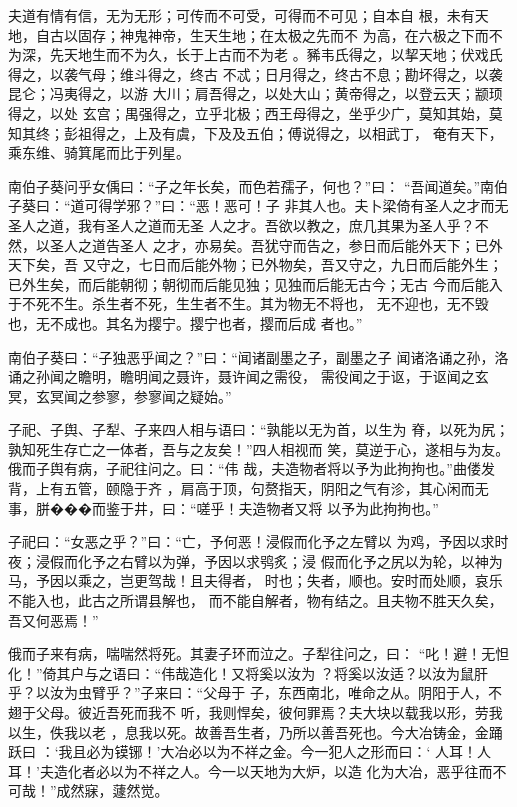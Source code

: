 \documentclass[a4paper,12pt,UTF8,twoside]{ctexbook}
\begin{document}
夫道有情有信，无为无形；可传而不可受，可得而不可见；自本自 根，未有天地，自古以固存；神鬼神帝，生天生地；在太极之先而不 为高，在六极之下而不为深，先天地生而不为久，长于上古而不为老 。豨韦氏得之，以挈天地；伏戏氏得之，以袭气母；维斗得之，终古 不忒；日月得之，终古不息；勘坏得之，以袭昆仑；冯夷得之，以游 大川；肩吾得之，以处大山；黄帝得之，以登云天；颛顼得之，以处 玄宫；禺强得之，立乎北极；西王母得之，坐乎少广，莫知其始，莫 知其终；彭祖得之，上及有虞，下及及五伯；傅说得之，以相武丁， 奄有天下，乘东维、骑箕尾而比于列星。

南伯子葵问乎女偊曰：“子之年长矣，而色若孺子，何也？”曰： “吾闻道矣。”南伯子葵曰：“道可得学邪？”曰：“恶！恶可！子 非其人也。夫卜梁倚有圣人之才而无圣人之道，我有圣人之道而无圣 人之才。吾欲以教之，庶几其果为圣人乎？不然，以圣人之道告圣人 之才，亦易矣。吾犹守而告之，参日而后能外天下；已外天下矣，吾 又守之，七日而后能外物；已外物矣，吾又守之，九日而后能外生； 已外生矣，而后能朝彻；朝彻而后能见独；见独而后能无古今；无古 今而后能入于不死不生。杀生者不死，生生者不生。其为物无不将也， 无不迎也，无不毁也，无不成也。其名为撄宁。撄宁也者，撄而后成 者也。”

南伯子葵曰：“子独恶乎闻之？”曰：“闻诸副墨之子，副墨之子 闻诸洛诵之孙，洛诵之孙闻之瞻明，瞻明闻之聂许，聂许闻之需役， 需役闻之于讴，于讴闻之玄冥，玄冥闻之参寥，参寥闻之疑始。”

子祀、子舆、子犁、子来四人相与语曰：“孰能以无为首，以生为 脊，以死为尻；孰知死生存亡之一体者，吾与之友矣！”四人相视而 笑，莫逆于心，遂相与为友。俄而子舆有病，子祀往问之。曰：“伟 哉，夫造物者将以予为此拘拘也。”曲偻发背，上有五管，颐隐于齐 ，肩高于顶，句赘指天，阴阳之气有沴，其心闲而无事，胼���而鉴于井，曰：“嗟乎！夫造物者又将 以予为此拘拘也。”

子祀曰：“女恶之乎？”曰：“亡，予何恶！浸假而化予之左臂以 为鸡，予因以求时夜；浸假而化予之右臂以为弹，予因以求鸮炙；浸 假而化予之尻以为轮，以神为马，予因以乘之，岂更驾哉！且夫得者， 时也；失者，顺也。安时而处顺，哀乐不能入也，此古之所谓县解也， 而不能自解者，物有结之。且夫物不胜天久矣，吾又何恶焉！”

俄而子来有病，喘喘然将死。其妻子环而泣之。子犁往问之，曰： “叱！避！无怛化！”倚其户与之语曰：“伟哉造化！又将奚以汝为 ？将奚以汝适？以汝为鼠肝乎？以汝为虫臂乎？”子来曰：“父母于 子，东西南北，唯命之从。阴阳于人，不翅于父母。彼近吾死而我不 听，我则悍矣，彼何罪焉？夫大块以载我以形，劳我以生，佚我以老 ，息我以死。故善吾生者，乃所以善吾死也。今大冶铸金，金踊跃曰 ：‘我且必为镆铘！’大冶必以为不祥之金。今一犯人之形而曰：‘ 人耳！人耳！’夫造化者必以为不祥之人。今一以天地为大炉，以造 化为大冶，恶乎往而不可哉！”成然寐，蘧然觉。
\end{document}
